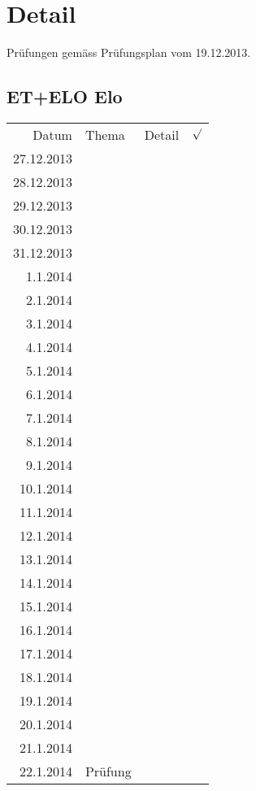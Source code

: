 
\section{Detail}
Prüfungen gemäss Prüfungsplan vom 19.12.2013. 

\subsection{ET+ELO Elo}
\begin{tabular}{r l p{} l}
\rowcolor{lgray} Datum       & Thema         & Detail & $\surd$ \\
\rowcolor{white}  27.12.2013 &               &  &  \\
\rowcolor{lgray}  28.12.2013 &               &  &  \\
\rowcolor{white}  29.12.2013 &               &  &  \\
\rowcolor{lgray}  30.12.2013 &               &  &  \\
\rowcolor{white}  31.12.2013 &               &  &  \\
\rowcolor{lgray}    1.1.2014 &               &  &  \\
\rowcolor{white}    2.1.2014 &               &  &  \\
\rowcolor{lgray}    3.1.2014 &               &  &  \\
\rowcolor{white}    4.1.2014 &               &  &  \\
\rowcolor{lgray}    5.1.2014 &               &  &  \\
\rowcolor{white}    6.1.2014 &               &  &  \\
\rowcolor{lgray}    7.1.2014 &               &  &  \\
\rowcolor{white}    8.1.2014 &               &  &  \\
\rowcolor{lgray}    9.1.2014 &               &  &  \\
\rowcolor{white}   10.1.2014 &               &  &  \\
\rowcolor{lgray}   11.1.2014 &               &  &  \\
\rowcolor{white}   12.1.2014 &               &  &  \\
\rowcolor{lgray}   13.1.2014 &               &  &  \\
\rowcolor{white}   14.1.2014 &               &  &  \\
\rowcolor{lgray}   15.1.2014 &               &  &  \\
\rowcolor{white}   16.1.2014 &               &  &  \\
\rowcolor{lgray}   17.1.2014 &               &  &  \\
\rowcolor{white}   18.1.2014 &               &  &  \\
\rowcolor{lgray}   19.1.2014 &               &  &  \\
\rowcolor{white}   20.1.2014 &               &  &  \\
\rowcolor{lgray}   21.1.2014 &               &  &  \\
\rowcolor{white}   22.1.2014 & Prüfung       &  &  \\
\end{tabular}

